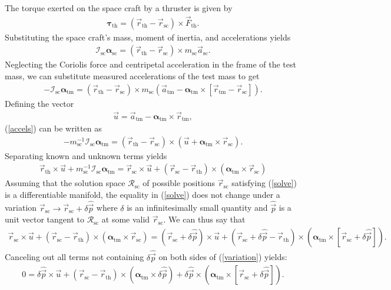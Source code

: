 \documentclass[10pt]{article}
\renewcommand{\t}{\text} %
\newcommand{\p}[1]{\left(#1\right)} %
\renewcommand{\sp}[1]{\left[#1\right]} %
\renewcommand{\v}{\vec} %
\newcommand{\uv}[1]{\hat{\vec{#1}}} %
\newcommand{\vv}{\boldsymbol} %
\renewcommand{\sc}{_{\t{sc}}}
\renewcommand{\th}{_{\t{th}}}
\newcommand{\tm}{_{\t{tm}}}
\newcommand{\I}{\mathcal{I}} %
\begin{document}
The torque exerted on the space craft by a thruster is given by
\begin{align}
  \vv\tau\th=\p{\v r\th-\v r\sc}\times\v F\th.
\end{align}
Substituting the space craft's mass, moment of inertia, and
accelerations yields
\begin{align}
  \I\sc\vv\alpha\sc=\p{\v r\th-\v r\sc}\times m\sc\v a\sc.
\end{align}
Neglecting the Coriolis force and centripetal acceleration in the
frame of the test mass, we can substitute measured accelerations of
the test mass to get
\begin{align}
  -\I\sc\vv\alpha\tm=\p{\v r\th-\v r\sc}\times m\sc\p{\v
    a\tm-\vv\alpha\tm\times\sp{\v r\tm-\v r\sc}}. \label{accels}
\end{align}
Defining the vector
\begin{align}
  \v u=\v a\tm-\vv\alpha\tm\times\v r\tm,
\end{align}
(\ref{accels}) can be written as
\begin{align}
  -m\sc^{-1}\I\sc\vv\alpha\tm=\p{\v r\th-\v r\sc} \times\p{\v
    u+\vv\alpha\tm\times\v r\sc}.
\end{align}
Separating known and unknown terms yields
\begin{align}
  \v r\th\times\v u+m\sc^{-1}\I\sc\vv\alpha\tm =\v r\sc\times\v u
  +\p{\v r\sc-\v r\th}\times\p{\vv\alpha\tm\times\v r\sc}
  \label{solve}
\end{align}
Assuming that the solution space $\mathcal R\sc$ of possible positions
$\v r\sc$ satisfying (\ref{solve}) is a differentiable manifold, the
equality in (\ref{solve}) does not change under a variation $\v
r\sc\to\v r\sc+\delta\uv p$ where $\delta$ is an infinitesimally small
quantity and $\uv p$ is a unit vector tangent to $\mathcal R\sc$ at
some valid $\v r\sc$. We can thus say that
\begin{align}
  \v r\sc\times\v u +\p{\v r\sc-\v r\th}\times\p{\vv\alpha\tm\times\v
    r\sc} =\p{\v r\sc+\delta\uv p}\times\v u +\p{\v r\sc+\delta\uv
    p-\v r\th}\times\p{\vv\alpha\tm\times\sp{\v r\sc+\delta\uv p}}.
  \label{variation}
\end{align}
Canceling out all terms not containing $\delta\uv p$ on both sides of
(\ref{variation}) yields:
\begin{align}
  0=\delta\uv p\times\v u+\p{\v r\sc-\v r\th}\times
  \p{\vv\alpha\tm\times\delta\uv p}+\delta\uv p\times
  \p{\vv\alpha\tm\times\sp{\v r\sc+\delta\uv p}}.
\end{align}
\end{document}
